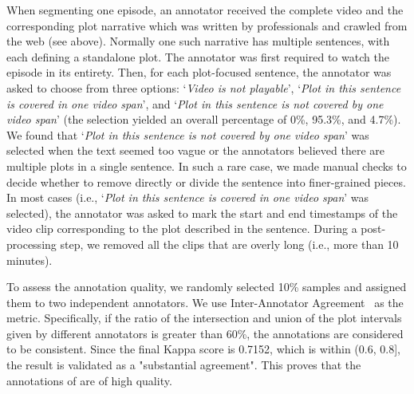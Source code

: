 When segmenting one episode, an annotator received the complete video and the corresponding plot narrative which was written by professionals and crawled from the web (see above). Normally one such narrative has multiple sentences, with each defining a standalone plot. 
The annotator was first required to watch the episode in its entirety.  
Then, for each plot-focused sentence, the annotator was asked to choose from three options: `\textit{Video is not playable}', `\textit{Plot in this sentence is covered in one video span}', and `\textit{Plot in this sentence is not covered by one video span}' (the selection yielded an overall percentage of 0\%, 95.3\%, and 4.7\%).
We found that `\textit{Plot in this sentence is not covered by one video span}' was selected when the text seemed too vague or the annotators believed there are multiple plots in a single sentence.  In such a rare case, we made manual checks to decide whether to remove directly or divide the sentence into finer-grained pieces.
In most cases (i.e., `\textit{Plot in this sentence is covered in one video span}' was selected), the annotator was asked to mark the start and end timestamps of the video clip corresponding to the plot described in the sentence. During a post-processing step, we removed all the clips that are overly long (i.e., more than 10 minutes). 

To assess the annotation quality, we randomly selected 10\% samples and assigned them to two independent annotators.
We use Inter-Annotator Agreement~\citep{iaa1996pm} as the metric. Specifically, if the ratio of the intersection and union of the plot intervals given by different annotators is greater than 60\%, the annotations are considered to be consistent. 
Since the final Kappa score is 0.7152, which is within (0.6, 0.8], the result is validated as a "substantial agreement". This proves that the annotations of \TVD are of high quality.